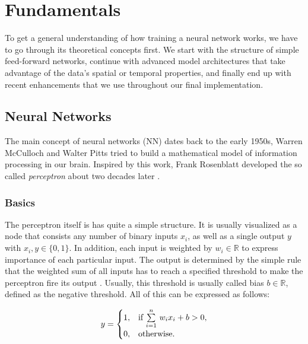 
\chapter{Fundamentals} \label{chapter:fundamentals}

To get a general understanding of how training a neural network works, we have to go through its theoretical concepts first. We start with the structure of simple feed-forward networks, continue with advanced model architectures that take advantage of the data's spatial or temporal properties, and finally end up with recent enhancements that we use throughout our final implementation.


\section{Neural Networks}

The main concept of neural networks (NN) dates back to the early 1950s, Warren McCulloch and Walter Pitts tried to build a mathematical model of information processing in our brain. Inspired by this work, Frank Rosenblatt developed the so called \textit{perceptron} about two decades later \parencite[p. 226]{pattern_and_ml}. 

\subsection{Basics}

The perceptron itself is has quite a simple structure. It is usually visualized as a node that consists any number of binary inputs $ x_{i} $, as well as a single output $ y $ with $ x_{i}, y \in \{0, 1\} $. In addition, each input is weighted by $ w_{i} \in \mathbb{R} $ to express importance of each particular input. The output is determined by the simple rule that the weighted sum of all inputs has to reach a specified threshold to make the perceptron fire its output \parencite{neural_nets_deep_learning}. Usually, this threshold is usually called bias $ b \in \mathbb{R} $, defined as the negative threshold. All of this can be expressed as follows:

\begin{equation} \label{eq:mlp}
  y = \begin{cases}
    1, & \text{if $ \sum\limits_{i=1}^n \, w_{i}x_{i} + b > 0$},\\
    0, & \text{otherwise}.
  \end{cases}
\end{equation}


